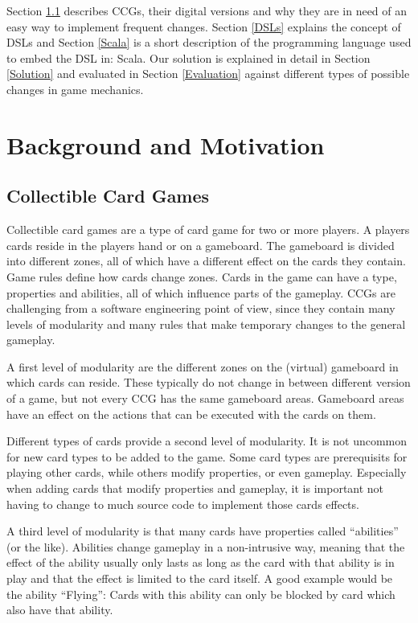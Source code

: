 \documentclass[twocolumn]{phdsymp}
\begin{document}
Section \ref{CCGs} describes CCGs, their digital versions and why they are in need of an easy way to implement frequent changes. Section \ref{DSLs} explains the concept of DSLs and Section \ref{Scala} is a short description of the programming language used to embed the DSL in: Scala.
Our solution is explained in detail in Section \ref{Solution} and evaluated in Section \ref{Evaluation} against different types of possible changes in game mechanics.

\section{Background and Motivation}
\label{Background and Motivation}
\subsection{Collectible Card Games}
\label{CCGs}
Collectible card games are a type of card game for two or more players. A players cards reside in the players hand or on a gameboard. The gameboard is divided into different zones, all of which have a different effect on the cards they contain. Game rules define how cards change zones. Cards in the game can have a type, properties and abilities, all of which influence parts of the gameplay. CCGs are challenging from a software engineering point of view, since they contain many levels of modularity and many rules that make temporary changes to the general gameplay.

A first level of modularity are the different zones on the (virtual) gameboard in which cards can reside. These typically do not change in between different version of a game, but not every CCG has the same gameboard areas. Gameboard areas have an effect on the actions that can be executed with the cards on them.

Different types of cards provide a second level of modularity. It is not uncommon for new card types to be added to the game. Some card types are prerequisits for playing other cards, while others modify properties, or even gameplay. Especially when adding cards that modify properties and gameplay, it is important not having to change to much source code to implement those cards effects.

A third level of modularity is that many cards have properties called ``abilities'' (or the like). Abilities change gameplay in a non-intrusive way, meaning that the effect of the ability usually only lasts as long as the card with that ability is in play and that the effect is limited to the card itself. A good example would be the ability ``Flying'': Cards with this ability can only be blocked by card which also have that ability.
\end{document}
